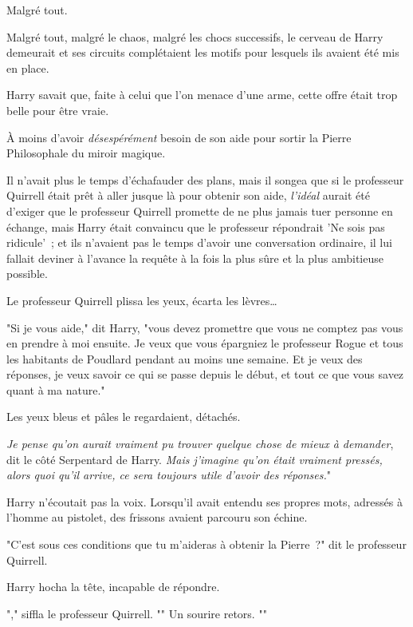 \later

Malgré tout.

Malgré tout, malgré le chaos, malgré les chocs successifs, le cerveau de Harry demeurait et ses circuits complétaient les motifs pour lesquels ils avaient été mis en place.

Harry savait que, faite à celui que l'on menace d'une arme, cette offre était trop belle pour être vraie.

À moins d'avoir \emph{désespérément} besoin de son aide pour sortir la Pierre Philosophale du miroir magique.

Il n'avait plus le temps d'échafauder des plans, mais il songea que si le professeur Quirrell était prêt à aller jusque là pour obtenir son aide, \emph{l'idéal} aurait été d'exiger que le professeur Quirrell promette de ne plus jamais tuer personne en échange, mais Harry était convaincu que le professeur répondrait 'Ne sois pas ridicule'~; et ils n'avaient pas le temps d'avoir une conversation ordinaire, il lui fallait deviner à l'avance la requête à la fois la plus sûre et la plus ambitieuse possible.

Le professeur Quirrell plissa les yeux, écarta les lèvres…

"Si je vous aide," dit Harry, "vous devez promettre que vous ne comptez pas vous en prendre à moi ensuite. Je veux que vous épargniez le professeur Rogue et tous les habitants de Poudlard pendant au moins une semaine. Et je veux des réponses, je veux savoir ce qui se passe depuis le début, et tout ce que vous savez quant à ma nature."

Les yeux bleus et pâles le regardaient, détachés.

\emph{Je pense qu'on aurait vraiment pu trouver quelque chose de mieux à demander}, dit le côté Serpentard de Harry. \emph{Mais j'imagine qu'on était vraiment pressés, alors quoi qu'il arrive, ce sera toujours utile d'avoir des réponses.}"

Harry n'écoutait pas la voix. Lorsqu'il avait entendu ses propres mots, adressés à l'homme au pistolet, des frissons avaient parcouru son échine.

"C'est sous ces conditions que tu m'aideras à obtenir la Pierre~?" dit le professeur Quirrell.

Harry hocha la tête, incapable de répondre.

"," siffla le professeur Quirrell. "" Un sourire retors. ""

